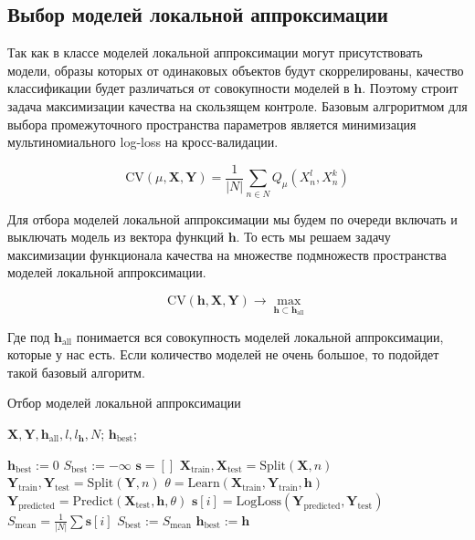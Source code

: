 \documentclass[12pt, fleqn, unicode]{article}
\newcommand{\bY}{\mathbf{Y}}
\newcommand{\bX}{\mathbf{X}}
\newcommand{\bh}{\mathbf{h}}
\newcommand{\bs}{\mathbf{s}}
\begin{document}
\subsection{Выбор моделей локальной аппроксимации}

Так как в классе моделей локальной аппроксимации могут присутствовать
модели, образы которых от одинаковых объектов будут скоррелированы, качество
классификации будет различаться от совокупности моделей в $\bh$. Поэтому строит
задача максимизации качества на скользящем контроле. Базовым алгроритмом
для выбора промежуточного пространства параметров является
минимизация мультиномиального log-loss на кросс-валидации.

$$
\mathrm{CV}(\mu, \bX, \bY) = \frac{1}{|N|}\sum_{n \in N}Q_{\mu}(X^l_n, X^k_n)
$$

Для отбора моделей локальной аппроксимации мы будем по очереди включать и выключать
модель из вектора функций $\bh$. То есть мы решаем задачу максимизации функционала
качества на множестве подмножеств пространства моделей локальной аппроксимации.

$$
\mathrm{CV}(\bh, \bX, \bY) \to \max_{\bh \subset \bh_{\mathrm{all}}}
$$

Где под $\bh_{\mathrm{all}}$ понимается вся совокупность моделей локальной
аппроксимации, которые у нас есть. Если количество моделей не очень большое,
то подойдет такой базовый алгоритм.

\begin{center}
    \begin{algorithm}[h]
    \caption{Отбор моделей локальной аппроксимации}
        \label{model_selection}
    \begin{algorithmic}[1]
    \REQUIRE $\bX, \bY, \bh_{\mathrm{all}}, l, l_\bh, N$;
    \ENSURE $\bh_{\mathrm{best}}$;

    \STATE $\bh_{\mathrm{best}} := 0$
    \STATE $S_{\mathrm{best}} := -\infty$
    \FOR{$\bh \text{ in } \mathrm{Combinations}(\bh_{\mathrm{all}})$}
        \STATE $\bs = []$
            \STATE $\bX_{\mathrm{train}}, \bX_\mathrm{test} = \mathrm{Split}(\bX, n)$
            \STATE $\bY_{\mathrm{train}}, \bY_\mathrm{test} = \mathrm{Split}(\bY, n)$
            \STATE $\theta = \mathrm{Learn}(\bX_{\mathrm{train}}, \bY_{\mathrm{train}}, \bh)$
            \STATE $\bY_\mathrm{predicted} = \mathrm{Predict}(\bX_\mathrm{test}, \bh, \theta)$
            \STATE $\bs[i] = \mathrm{LogLoss}(\bY_\mathrm{predicted}, \bY_\mathrm{test})$
        \ENDFOR
        \STATE $S_{\mathrm{mean}} = \frac{1}{|N|}\sum \bs[i]$
            \STATE $ S_{\mathrm{best}} := S_{\mathrm{mean}} $
            \STATE $ \bh_{\mathrm{best}} := \bh $
        \ENDIF
    \ENDFOR
\end{algorithmic}
\end{algorithm}
\end{center}
\end{document}
